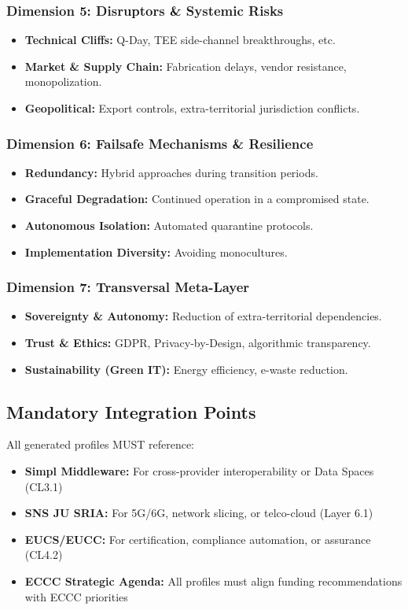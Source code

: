 \documentclass[12pt,a4paper]{report}
\begin{document}
\subsubsection*{Dimension 5: Disruptors \& Systemic Risks}
\begin{itemize}
    \item \textbf{Technical Cliffs:} Q-Day, TEE side-channel breakthroughs, etc.
    \item \textbf{Market \& Supply Chain:} Fabrication delays, vendor resistance, monopolization.
    \item \textbf{Geopolitical:} Export controls, extra-territorial jurisdiction conflicts.
\end{itemize}

\subsubsection*{Dimension 6: Failsafe Mechanisms \& Resilience}
\begin{itemize}
    \item \textbf{Redundancy:} Hybrid approaches during transition periods.
    \item \textbf{Graceful Degradation:} Continued operation in a compromised state.
    \item \textbf{Autonomous Isolation:} Automated quarantine protocols.
    \item \textbf{Implementation Diversity:} Avoiding monocultures.
\end{itemize}

\subsubsection*{Dimension 7: Transversal Meta-Layer}
\begin{itemize}
    \item \textbf{Sovereignty \& Autonomy:} Reduction of extra-territorial dependencies.
    \item \textbf{Trust \& Ethics:} GDPR, Privacy-by-Design, algorithmic transparency.
    \item \textbf{Sustainability (Green IT):} Energy efficiency, e-waste reduction.
\end{itemize}

\subsection*{Mandatory Integration Points}
All generated profiles MUST reference:
\begin{itemize}
    \item \textbf{Simpl Middleware:} For cross-provider interoperability or Data Spaces (CL3.1)
    \item \textbf{SNS JU SRIA:} For 5G/6G, network slicing, or telco-cloud (Layer 6.1)
    \item \textbf{EUCS/EUCC:} For certification, compliance automation, or assurance (CL4.2)
    \item \textbf{ECCC Strategic Agenda:} All profiles must align funding recommendations with ECCC priorities
\end{itemize}
\end{document}
